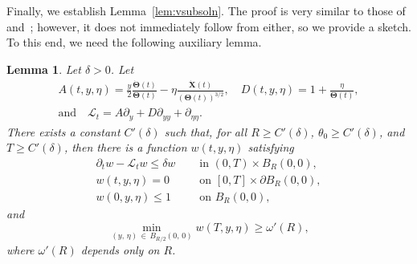 \documentclass[10pt]{amsart}
\newtheorem{lemm}[theo]{Lemma}\newtheorem{prop}[theo]{Proposition}\newtheorem{coro}[theo]{Corollary}\newtheorem{conj}[theo]{Conjecture}
\theoremstyle{definition}\newtheorem{defi}[theo]{Definition}\newtheorem{rema}[theo]{Remark}\newtheorem{exam}[theo]{Example}\newtheorem{exem}[theo]{Example}\newtheorem{nota}[theo]{Notation}
\newcommand{\bX}{\mathbf{X}}
\newcommand{\mL}{\mathcal{L}}
\newcommand{\bTheta}{\boldsymbol{\Theta}}
\newcommand{\1}{\mathds{1}}
\begin{document}
Finally, we establish Lemma~\ref{lem:vsubsoln}. The proof is very similar to those of~\cite[Lemma~4.1]{BHR_acceleration} and~\cite[Lemma~13]{BouinChanHendersonKim}; however, it does not immediately follow from either, so we provide a sketch. To this end, we need the following auxiliary lemma.
\begin{lemm}\label{lem:aux to v subsoln}
Let $\delta>0$. Let
\begin{multline*}
A(t,y,\eta)=\frac{y}{2}\frac{\dot{\bTheta}(t)}{\bTheta(t)} - \eta \frac{\dot{\bX}(t)}{(\bTheta(t))^{3/2}}, \quad D(t,y,\eta)= 1+\frac{\eta}{\bTheta(t)}, \\
\text{and}\quad
\mL_t = A\partial_y+D\partial_{yy}+\partial_{\eta \eta}.
\end{multline*}
There exists a constant $C'(\delta)$ such that, for all $R\geq C'(\delta)$, $\theta_0\geq C'(\delta)$, and $T\geq C'(\delta)$, then there is a function $w(t,y,\eta)$ satisfying
\begin{align}
\partial_tw -\mL_t w \leq \delta w \quad &\text{ in } (0,T)\times B_R(0,0),\label{eq:w}\\
w(t,y,\eta) =0 \quad &\text{ on }[0,T]\times \partial B_R(0,0),\label{eq:w on bdry}\\
w(0,y,\eta)\leq 1 \quad &\text{ on }B_R(0,0),\label{eq:w ub}
\end{align}
and
\begin{equation}\label{eq:w lb}
\min_{(y,\,\eta)\,\in\,B_{R/2}(0,\,0)}w(T,y,\eta) \geq \omega'(R),
\end{equation}
where $\omega'(R)$ depends only on $R$.
\end{lemm}
\end{document}
